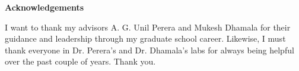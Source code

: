 \begin{doublespace}
  \begin{center}
    \textbf{Acknowledgements}
  \end{center}
  I want to thank my advisors A. G. Unil Perera and Mukesh Dhamala for their guidance and leadership through my graduate school career.  Likewise, I must thank everyone in Dr. Perera's and Dr. Dhamala's labs for always being helpful over the past couple of years.  Thank you.
\end{doublespace}